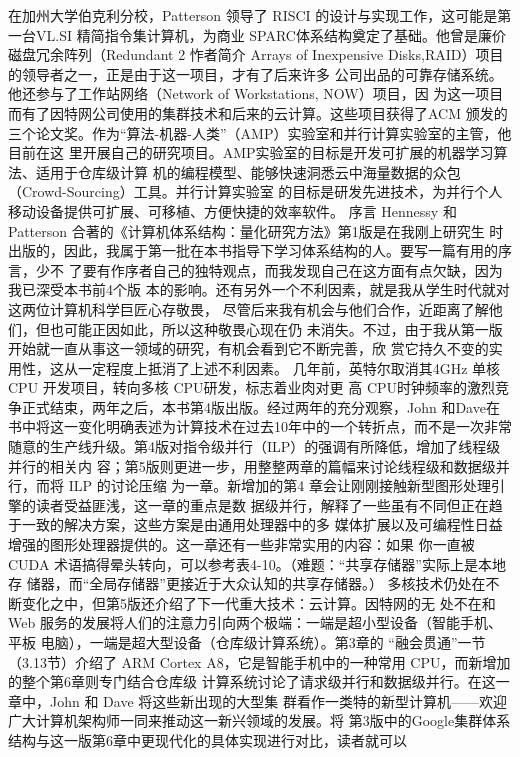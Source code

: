 在加州大学伯克利分校，Patterson 领导了 RISCI 的设计与实现工作，这可能是第一台VL.SI
精简指令集计算机，为商业 SPARC体系结构奠定了基础。他曾是廉价磁盘冗余阵列（Redundant
2
怍者简介
Arrays of Inexpensive Disks,RAID）项目的领导者之一，正是由于这一项目，才有了后来许多
公司出品的可靠存储系统。他还参与了工作站网络（Network of Workstations, NOW）项目，因
为这一项目而有了因特网公司使用的集群技术和后来的云计算。这些项目获得了ACM 颁发的
三个论文奖。作为“算法-机器-人类”（AMP）实验室和并行计算实验室的主管，他目前在这
里开展自己的研究项目。AMP实验室的目标是开发可扩展的机器学习算法、适用于仓库级计算
机的编程模型、能够快速洞悉云中海量数据的众包（Crowd-Sourcing）工具。并行计算实验室
的目标是研发先进技术，为并行个人移动设备提供可扩展、可移植、方便快捷的效率软件。
序言
Hennessy 和 Patterson 合著的《计算机体系结构：量化研究方法》第1版是在我刚上研究生
时出版的，因此，我属于第一批在本书指导下学习体系结构的人。要写一篇有用的序言，少不
了要有作序者自己的独特观点，而我发现自己在这方面有点欠缺，因为我已深受本书前4个版
本的影响。还有另外一个不利因素，就是我从学生时代就对这两位计算机科学巨匠心存敬畏，
尽管后来我有机会与他们合作，近距离了解他们，但也可能正因如此，所以这种敬畏心现在仍
未消失。不过，由于我从第一版开始就一直从事这一领域的研究，有机会看到它不断完善，欣
赏它持久不变的实用性，这从一定程度上抵消了上述不利因素。
几年前，英特尔取消其4GHz 单核 CPU 开发项目，转向多核 CPU研发，标志着业肉对更
高 CPU时钟频率的激烈竞争正式结束，两年之后，本书第4版出版。经过两年的充分观察，John
和Dave在书中将这一变化明确表述为计算技术在过去10年中的一个转折点，而不是一次非常
随意的生产线升级。第4版对指令级并行（ILP）的强调有所降低，增加了线程级并行的相关内
容；第5版则更进一步，用整整两章的篇幅来讨论线程级和数据级并行，而将 ILP 的讨论压缩
为一章。新增加的第4 章会让刚刚接触新型图形处理引擎的读者受益匪浅，这一章的重点是数
据级并行，解释了一些虽有不同但正在趋于一致的解决方案，这些方案是由通用处理器中的多
媒体扩展以及可编程性日益增强的图形处理器提供的。这一章还有一些非常实用的内容：如果
你一直被CUDA 术语搞得晕头转向，可以参考表4-10。（难题：“共享存储器”实际上是本地存
储器，而“全局存储器”更接近于大众认知的共享存储器。）
多核技术仍处在不断变化之中，但第5版还介绍了下一代重大技术：云计算。因特网的无
处不在和 Web 服务的发展将人们的注意力引向两个极端：一端是超小型设备（智能手机、平板
电脑），一端是超大型设备（仓库级计算系统）。第3章的 “融会贯通”一节（3.13节）介绍了
ARM Cortex A8，它是智能手机中的一种常用 CPU，而新增加的整个第6章则专门结合仓库级
计算系统讨论了请求级并行和数据级并行。在这一章中，John 和 Dave 将这些新出现的大型集
群看作一类特的新型计算机——欢迎广大计算机架构师一同来推动这一新兴领域的发展。将
第3版中的Google集群体系结构与这一版第6章中更现代化的具体实现进行对比，读者就可以
